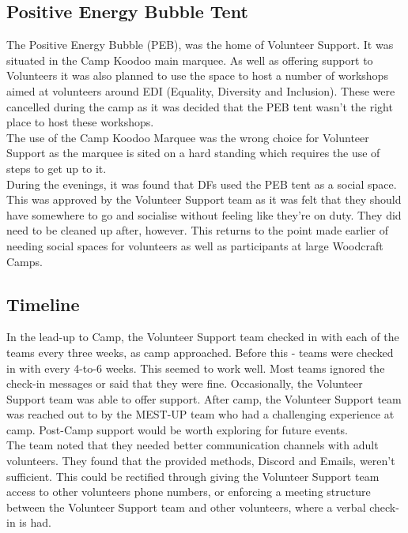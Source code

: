 \subsection{Positive Energy Bubble Tent}
The Positive Energy Bubble (PEB), was the home of Volunteer Support. It was situated in the Camp Koodoo main marquee. As well as offering support to Volunteers it was also planned to use the space to host a number of workshops aimed at volunteers around EDI (Equality, Diversity and Inclusion). These were cancelled during the camp as it was decided that the PEB tent wasn't the right place to host these workshops.\\

The use of the Camp Koodoo Marquee was the wrong choice for Volunteer Support as the marquee is sited on a hard standing which requires the use of steps to get up to it. \\

During the evenings, it was found that DFs used the PEB tent as a social space. This was approved by the Volunteer Support team as it was felt that they should have somewhere to go and socialise without feeling like they're on duty. They did need to be cleaned up after, however. This returns to the point made earlier of needing social spaces for volunteers as well as participants at large Woodcraft Camps.

\subsection{Timeline}
In the lead-up to Camp, the Volunteer Support team checked in with each of the teams every three weeks, as camp approached. Before this - teams were checked in with every 4-to-6 weeks. This seemed to work well. Most teams ignored the check-in messages or said that they were fine. Occasionally, the Volunteer Support team was able to offer support. After camp, the Volunteer Support team was reached out to by the MEST-UP team who had a challenging experience at camp. Post-Camp support would be worth exploring for future events.\\

The team noted that they needed better communication channels with adult volunteers. They found that the provided methods, Discord and Emails, weren't sufficient. This could be rectified through giving the Volunteer Support team access to other volunteers phone numbers, or enforcing a meeting structure between the Volunteer Support team and other volunteers, where a verbal check-in is had.

